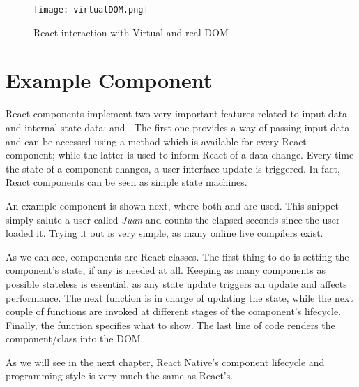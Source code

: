 \begin{figure}[H]
	\centering
	\texttt{[image: virtualDOM.png]}
	\caption{React interaction with Virtual and real DOM}
\end{figure}

\section{Example Component}

React components implement two very important features related to input data and internal state data:  and . The first one provides a way of passing input data and can be accessed using a  method which is available for every React component; while the latter is used to inform React of a data change. Every time the state of a component changes, a user interface update is triggered. In fact, React components can be seen as simple state machines.

An example component is shown next, where both  and  are used. This snippet simply salute a user called \textit{Juan} and counts the elapsed seconds since the user loaded it. Trying it out is very simple, as many online live compilers exist.

\lstset{style=myhtml,linewidth=15cm}


As we can see, components are React classes. The first thing to do is setting the component's state, if any is needed at all. Keeping as many components as possible stateless is essential, as any state update triggers an update and affects performance. The next function is in charge of updating the state, while the next couple of functions are invoked at different stages of the component's lifecycle. Finally, the  function specifies what to show. The last line of code renders the component/class into the DOM.

As we will see in the next chapter, React Native's component lifecycle and programming style is very much the same as React's.